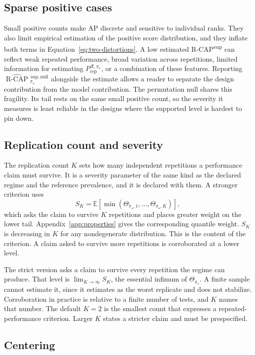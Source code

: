 \documentclass[11pt]{article}
\newcommand{\Regime}{\mathcal{R}}
\newcommand{\E}{\mathbb{E}}
\newcommand{\RCAPnullHat}{\widehat{\operatorname{R\text{-}CAP}}{}^{\,\mathrm{sup,null}}_{\pi_\star}}
\newcommand{\PRep}{P_{\mathrm{rep}}^{\Regime,\pi_\star}}
\theoremstyle{remark}
\begin{document}
\subsection{Sparse positive cases}
\label{sec:sparse}

Small positive counts make AP discrete and sensitive to individual ranks. They also limit empirical estimation of the positive score distribution, and they inflate both terms in Equation~\eqref{eq:two-distortions}. A low estimated R-CAP\textsuperscript{sup} can reflect weak repeated performance, broad variation across repetitions, limited information for estimating $\PRep$, or a combination of these features. Reporting $\RCAPnullHat$ alongside the estimate allows a reader to separate the design contribution from the model contribution. The permutation null shares this fragility. Its tail rests on the same small positive count, so the severity it measures is least reliable in the designs where the supported level is hardest to pin down.

\subsection{Replication count and severity}

The replication count $K$ sets how many independent repetitions a performance claim must survive. It is a severity parameter of the same kind as the declared regime and the reference prevalence, and it is declared with them. A stronger criterion uses
\[
S_K
=
\E\left[
\min(\Theta_{\pi_\star,1},\ldots,\Theta_{\pi_\star,K})
\right],
\]
which asks the claim to survive $K$ repetitions and places greater weight on the lower tail. Appendix~\ref{app:properties} gives the corresponding quantile weight. $S_K$ is decreasing in $K$ for any nondegenerate distribution. This is the content of the criterion. A claim asked to survive more repetitions is corroborated at a lower level.

The strict version asks a claim to survive every repetition the regime can produce. That level is $\lim_{K\to\infty}S_K$, the essential infimum of $\Theta_{\pi_\star}$. A finite sample cannot estimate it, since it estimates as the worst replicate and does not stabilize. Corroboration in practice is relative to a finite number of tests, and $K$ names that number. The default $K=2$ is the smallest count that expresses a repeated-performance criterion. Larger $K$ states a stricter claim and must be prespecified.

\subsection{Centering}
\end{document}
